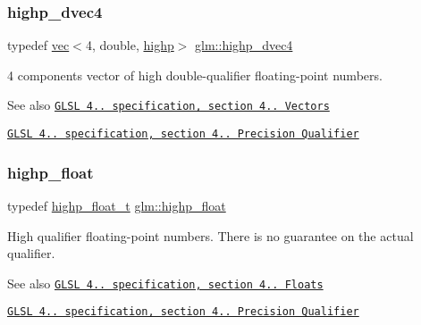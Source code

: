 \subsubsection{\texorpdfstring{highp\+\_\+dvec4}{highp\_dvec4}}
{\footnotesize\ttfamily typedef \hyperlink{structglm_1_1vec}{vec}$<$4, double, \hyperlink{namespaceglm_a36ed105b07c7746804d7fdc7cc90ff25ac6f7eab42eacbb10d59a58e95e362074}{highp}$>$ \hyperlink{group__core__precision_ga6e8645fa38f0260e57f1fb7555de0c2f}{glm\+::highp\+\_\+dvec4}}

4 components vector of high double-\/qualifier floating-\/point numbers.

\begin{DoxySeeAlso}{See also}
\href{http://www.opengl.org/registry/doc/GLSLangSpec.4.20.8.pdf}{\tt G\+L\+SL 4.. specification, section 4.. Vectors} 

\href{http://www.opengl.org/registry/doc/GLSLangSpec.4.20.8.pdf}{\tt G\+L\+SL 4.. specification, section 4.. Precision Qualifier} 
\end{DoxySeeAlso}
\mbox{\label{group__core__precision_ga3d443a093adc053638ed7f81c5bfe300}} 
\subsubsection{\texorpdfstring{highp\+\_\+float}{highp\_float}}
{\footnotesize\ttfamily typedef \hyperlink{namespaceglm_af6f4e45ae06ae3f979dd30cafe7d07c6}{highp\+\_\+float\+\_\+t} \hyperlink{group__core__precision_ga3d443a093adc053638ed7f81c5bfe300}{glm\+::highp\+\_\+float}}

High qualifier floating-\/point numbers. There is no guarantee on the actual qualifier.

\begin{DoxySeeAlso}{See also}
\href{http://www.opengl.org/registry/doc/GLSLangSpec.4.20.8.pdf}{\tt G\+L\+SL 4.. specification, section 4.. Floats} 

\href{http://www.opengl.org/registry/doc/GLSLangSpec.4.20.8.pdf}{\tt G\+L\+SL 4.. specification, section 4.. Precision Qualifier} 
\end{DoxySeeAlso}
\mbox{\label{group__core__precision_gaafed5240eb0a43328cb75faf5fb0a8c2}} 
